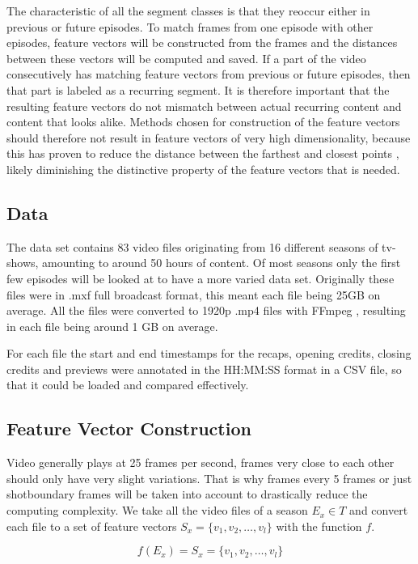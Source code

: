 \documentclass{article}
\begin{document}
The characteristic of all the segment classes is that they reoccur either in previous or future episodes. To match frames from one episode with other episodes, feature vectors will be constructed from the frames and the distances between these vectors will be computed and saved. If a part of the video consecutively has matching feature vectors from previous or future episodes, then that part is labeled as a recurring segment. It is therefore important that the resulting feature vectors do not mismatch between actual recurring content and content that looks alike. Methods chosen for construction of the feature vectors should therefore not result in feature vectors of very high dimensionality, because this has proven to reduce the distance between the farthest and closest points \cite{beyer1999nearest}, likely diminishing the distinctive property of the feature vectors that is needed. 

\subsection{Data}
The data set contains 83 video files originating from 16 different seasons of tv-shows, amounting to around 50 hours of content. Of most seasons only the first few episodes will be looked at to have a more varied data set. Originally these files were in .mxf full broadcast format, this meant each file being 25GB on average. All the files were converted to 1920p .mp4 files with FFmpeg \cite{ffmpeg}, resulting in each file being around 1 GB on average.

For each file the start and end timestamps for the recaps, opening credits, closing credits and previews were annotated in the HH:MM:SS format in a CSV file, so that it could be loaded and compared effectively.

\subsection{Feature Vector Construction}
Video generally plays at 25 frames per second, frames very close to each other should only have very slight variations. That is why frames every 5 frames or just shotboundary frames will be taken into account to drastically reduce the computing complexity. We take all the video files of a season $E_x \in T$ and convert each file to a set of feature vectors $S_x = \{v_1, v_2, \dots, v_l\}$ with the function $f$.

\[f(E_x) = S_x = \{v_1, v_2, \dots, v_l\}\]
\end{document}
